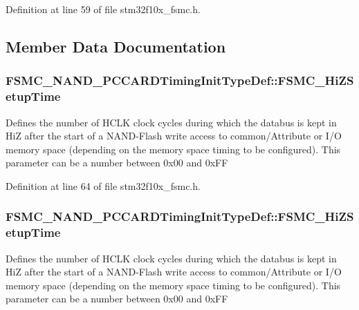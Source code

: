 Definition at line 59 of file stm32f10x\+\_\+fsmc.\+h.



\subsection{Member Data Documentation}
\subsubsection[{\texorpdfstring{F\+S\+M\+C\+\_\+\+Hi\+Z\+Setup\+Time}{FSMC_HiZSetupTime}}]{ F\+S\+M\+C\+\_\+\+N\+A\+N\+D\+\_\+\+P\+C\+C\+A\+R\+D\+Timing\+Init\+Type\+Def\+::\+F\+S\+M\+C\+\_\+\+Hi\+Z\+Setup\+Time}\hypertarget{struct_f_s_m_c___n_a_n_d___p_c_c_a_r_d_timing_init_type_def_aac7c41617e579fd5187e0a2d6b167490}{}\label{struct_f_s_m_c___n_a_n_d___p_c_c_a_r_d_timing_init_type_def_aac7c41617e579fd5187e0a2d6b167490}
Defines the number of H\+C\+LK clock cycles during which the databus is kept in HiZ after the start of a N\+A\+N\+D-\/\+Flash write access to common/\+Attribute or I/O memory space (depending on the memory space timing to be configured). This parameter can be a number between 0x00 and 0x\+FF 

Definition at line 64 of file stm32f10x\+\_\+fsmc.\+h.

\subsubsection[{\texorpdfstring{F\+S\+M\+C\+\_\+\+Hi\+Z\+Setup\+Time}{FSMC_HiZSetupTime}}]{ F\+S\+M\+C\+\_\+\+N\+A\+N\+D\+\_\+\+P\+C\+C\+A\+R\+D\+Timing\+Init\+Type\+Def\+::\+F\+S\+M\+C\+\_\+\+Hi\+Z\+Setup\+Time}\hypertarget{struct_f_s_m_c___n_a_n_d___p_c_c_a_r_d_timing_init_type_def_a8a2a2a9e71dbf276fddad2bb32c0d256}{}\label{struct_f_s_m_c___n_a_n_d___p_c_c_a_r_d_timing_init_type_def_a8a2a2a9e71dbf276fddad2bb32c0d256}
Defines the number of H\+C\+LK clock cycles during which the databus is kept in HiZ after the start of a N\+A\+N\+D-\/\+Flash write access to common/\+Attribute or I/O memory space (depending on the memory space timing to be configured). This parameter can be a number between 0x00 and 0x\+FF 

